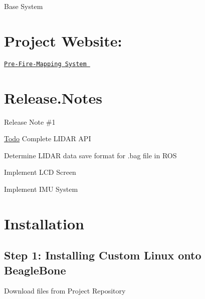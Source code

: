\begin{DoxyItemize}
\item Base System
\end{DoxyItemize}



\hypertarget{index_website}{}\section{Project Website:}\label{index_website}
\href{http://williametter.com/portfolio/projects/pre-fire-mapping-system/}{\tt Pre-\/Fire-\/Mapping System }



 \hypertarget{index_notes}{}\section{Release.Notes}\label{index_notes}

\begin{DoxyItemize}
\item Release Note \#1
\end{DoxyItemize}





\begin{Desc}
\item[\hyperlink{todo__todo000001}{Todo}]Complete LIDAR API 

Determine LIDAR data save format for .bag file in ROS 

Implement LCD Screen 

Implement IMU System\end{Desc}


\hypertarget{index_install_sec}{}\section{Installation}\label{index_install_sec}
\hypertarget{index_step1}{}\subsection{Step 1: Installing Custom Linux onto BeagleBone}\label{index_step1}

\begin{DoxyEnumerate}
\item Download files from Project Repository 
\end{DoxyEnumerate}